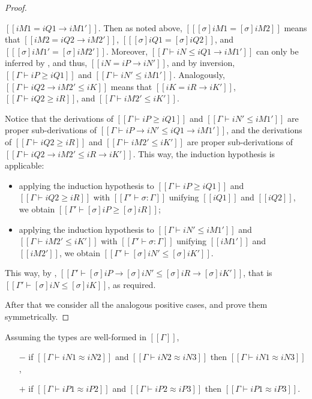\begin{proof}
\begin{caseof}
    \item $[[iM1 = iQ1 → iM1']]$. Then as noted above, 
      $[[ [σ]iM1 = [σ]iM2 ]]$ means that $[[iM2 = iQ2 → iM2']]$, $[[ [σ]iQ1 = [σ]iQ2 ]]$, and $[[ [σ]iM1' = [σ]iM2' ]]$.
      Moreover, $[[Γ ⊢ iN ≤ iQ1 → iM1']]$ can only be inferred by ,
      and thus, $[[iN = iP → iN']]$, and by inversion, $[[Γ ⊢ iP ≥ iQ1]]$ and $[[Γ ⊢ iN' ≤ iM1']]$.
      Analogously, $[[Γ ⊢ iQ2 → iM2' ≤ iK]]$ means that $[[iK = iR → iK']]$, $[[Γ ⊢ iQ2 ≥ iR]]$, and $[[Γ ⊢ iM2' ≤ iK']]$.

      Notice that the derivations of $[[Γ ⊢ iP ≥ iQ1]]$ and $[[Γ ⊢ iN' ≤ iM1']]$ are proper sub-derivations of
      $[[Γ ⊢ iP → iN' ≤ iQ1 → iM1']]$, and the derivations of $[[Γ ⊢ iQ2 ≥ iR]]$ and $[[Γ ⊢ iM2' ≤ iK']]$ are proper sub-derivations of
      $[[Γ ⊢ iQ2 → iM2' ≤ iR → iK']]$. This way, the induction hypothesis is applicable:
      \begin{itemize}
        \item applying the induction hypothesis to $[[Γ ⊢ iP ≥ iQ1]]$ and $[[Γ ⊢ iQ2 ≥ iR]]$ 
          with $[[Γ' ⊢ σ : Γ]]$ unifying $[[iQ1]]$ and $[[iQ2]]$, we obtain $[[Γ' ⊢ [σ]iP ≥ [σ]iR]]$;
        \item applying the induction hypothesis to $[[Γ ⊢ iN' ≤ iM1']]$ and $[[Γ ⊢ iM2' ≤ iK']]$ 
          with $[[Γ' ⊢ σ : Γ]]$ unifying $[[iM1']]$ and $[[iM2']]$, we obtain $[[Γ' ⊢ [σ]iN' ≤ [σ]iK']]$.
      \end{itemize}
      This way, by , $[[Γ' ⊢ [σ]iP → [σ]iN' ≤ [σ]iR → [σ]iK']]$,
      that is $[[Γ' ⊢ [σ]iN ≤ [σ]iK]]$, as required.
  \end{caseof}
  After that we consider all the 
  analogous positive cases, and prove them symmetrically.
\end{proof}

\begin{corollary} \label{corollary:equivalence-transitivity}
  Assuming the types are well-formed in $[[Γ]]$,
  \begin{itemize}
    \item[$-$] if $[[Γ ⊢ iN1 ≈ iN2]]$ and $[[Γ ⊢ iN2 ≈ iN3]]$ then $[[Γ ⊢ iN1 ≈ iN3]]$,
    \item[$+$] if $[[Γ ⊢ iP1 ≈ iP2]]$ and $[[Γ ⊢ iP2 ≈ iP3]]$ then $[[Γ ⊢ iP1 ≈ iP3]]$.
  \end{itemize}
\end{corollary}
